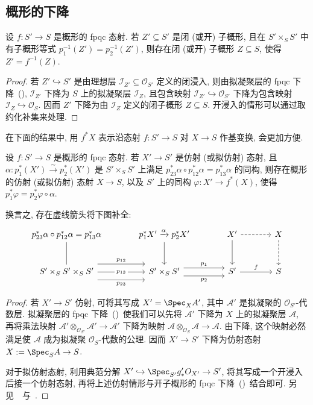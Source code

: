 \subsection{概形的下降}\label{src:3.1.3-subsection}
\begin{proposition}\label{src:3.1.11}
设 $f:S'\to S$ 是概形的 fpqc 态射. 若 $Z'\subseteq S'$ 是闭 (或开) 子概形, 且在 $S'\times_S S'$ 中有子概形等式 $p_1^{-1}(Z')=p_2^{-1}(Z')$, 则存在闭 (或开) 子概形 $Z\subseteq S$, 使得 $Z'=f^{-1}(Z)$.
\end{proposition}
\begin{proof}
若 $Z'\hookrightarrow S'$ 是由理想层 $\mathcal I_{Z'}\subseteq\mathcal O_{S'}$ 定义的闭浸入, 则由拟凝聚层的 fpqc 下降~(), $\mathcal I_{Z'}$ 下降为 $S$ 上的拟凝聚层 $\mathcal I_Z$, 且包含映射 $\mathcal I_{Z'}\hookrightarrow\mathcal O_{S'}$ 下降为包含映射 $\mathcal I_Z\hookrightarrow\mathcal O_S$. 因而 $Z'$ 下降为由 $\mathcal I_Z$ 定义的闭子概形 $Z\subseteq S$. 开浸入的情形可以通过取约化补集来处理.
\end{proof}
在下面的结果中, 用 $f^*X$ 表示沿态射 $f:S'\to S$ 对 $X\to S$ 作基变换, 会更加方便.
\begin{proposition}\label{src:3.1.12}
设 $f:S'\to S$ 是概形的 fpqc 态射. 若 $X'\to S'$ 是仿射 (或拟仿射) 态射, 且 $\alpha:p_1^*(X')\xrightarrow{\sim}p_2^*(X')$ 是 $S'\times_S S'$ 上满足 $p_{23}^*\alpha\circ p_{12}^*\alpha=p_{13}^*\alpha$ 的同构, 则存在概形的仿射 (或拟仿射) 态射 $X\to S$, 以及 $S'$ 上的同构 $\varphi:X'\to f^*(X)$, 使得 $p_1^*\varphi=p_2^*\varphi\circ\alpha$.
\end{proposition}
换言之, 存在虚线箭头将下图补全:
\[
\begin{tikzcd}[column sep=large,row sep=large]
{p_{23}^*\alpha\circ p_{12}^*\alpha=p_{13}^*\alpha}\arrow[d,dash]&
{p_1^*X'\xrightarrow{\alpha}p_2^*X'}\arrow[d]&
X'\arrow[d]\arrow[r,dashed]&X\arrow[d,dashed]\\
S'\times_S S'\times_S S'
\arrow[r,shift left=2.2ex,"p_{12}"]
\arrow[r,"p_{13}" description]\arrow[r,shift right=2.2ex,"p_{23}"']&
S'\times_S S'\arrow[r,shift left=1.1ex,"p_1"]
\arrow[r,shift right=1.1ex,"p_2"']&S'\arrow[r,"f"]&S
\end{tikzcd}
\]
\begin{proof}
若 $X'\to S'$ 仿射, 可将其写成 $X'=\Spec_X\mathcal A'$, 其中 $\mathcal A'$ 是拟凝聚的 $\mathcal O_{S'}$-代数层. 拟凝聚层的 fpqc 下降~()~使我们可以先将 $\mathcal A'$ 下降为 $X$ 上的拟凝聚层 $\mathcal A$, 再将乘法映射 $\mathcal A'\otimes_{\mathcal O_{S'}}\mathcal A'\to\mathcal A'$ 下降为映射 $\mathcal A\otimes_{\mathcal O_S}\mathcal A\to\mathcal A$. 由下降, 这个映射必然满足使 $\mathcal A$ 成为拟凝聚 $\mathcal O_S$-代数的公理. 因而 $X'\to S'$ 下降为仿射态射 $X:=\Spec_S\mathcal A\to S$.

对于拟仿射态射, 利用典范分解 $X'\hookrightarrow\Spec_{S'}g_*'\mathcal O_{X'}\to S'$, 将其写成一个开浸入后接一个仿射态射, 再将上述仿射情形与开子概形的 fpqc 下降~()~结合即可. 另见~\cite[定理 $6.6$]{BLR90}~与~\cite[定理 $4.33$]{Vis05}.
\end{proof}
